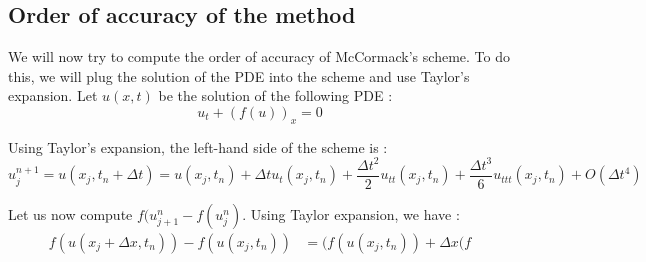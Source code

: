 \subsection{Order of accuracy of the method}
We will now try to compute the order of accuracy of McCormack's scheme. To do this, we will plug the solution of the PDE into the scheme and use Taylor's expansion. Let $u(x,t)$ be the solution of the following PDE : 
$$u_t + (f(u))_x = 0$$

Using Taylor's expansion, the left-hand side of the scheme is :
$$u_j^{n+1} = u(x_j,t_n + \Delta t) = u(x_j,t_n) + \Delta t u_t(x_j,t_n) + \frac{\Delta t^2}{2} u_{tt}(x_j,t_n) + \frac{\Delta t^3}{6} u_{ttt}(x_j,t_n) + O(\Delta t^4)$$

Let us now compute $f(u_{j+1}^n-f(u_j^n)$. Using Taylor expansion, we have :
\begin{align*}
f(u(x_j+\Delta x,t_n))-f(u(x_j,t_n)) &= (f(u(x_j,t_n)) + \Delta x (f
\end{align*}